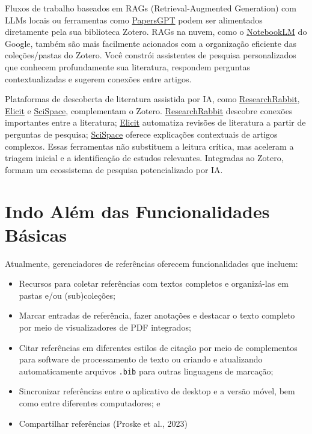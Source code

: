 \documentclass[
  a4paper,
]{book}
\begin{document}
Fluxos de trabalho baseados em RAGs (Retrieval-Augmented Generation) com
LLMs locais ou ferramentas como
\href{https://www.papersgpt.com/}{PapersGPT} podem ser alimentados
diretamente pela sua biblioteca Zotero. RAGs na nuvem, como o
\href{https://notebooklm.google.com/}{NotebookLM} do Google, também são
mais facilmente acionados com a organização eficiente das
coleções/pastas do Zotero. Você constrói assistentes de pesquisa
personalizados que conhecem profundamente sua literatura, respondem
perguntas contextualizadas e sugerem conexões entre artigos.

Plataformas de descoberta de literatura assistida por IA, como
\href{https://www.researchrabbit.ai/}{ResearchRabbit},
\href{https://elicit.com/}{Elicit} e
\href{https://scispace.com/}{SciSpace}, complementam o Zotero.
\href{https://www.researchrabbit.ai/}{ResearchRabbit} descobre conexões
importantes entre a literatura; \href{https://elicit.com/}{Elicit}
automatiza revisões de literatura a partir de perguntas de pesquisa;
\href{https://scispace.com/}{SciSpace} oferece explicações contextuais
de artigos complexos. Essas ferramentas não substituem a leitura
crítica, mas aceleram a triagem inicial e a identificação de estudos
relevantes. Integradas ao Zotero, formam um ecossistema de pesquisa
potencializado por IA.

\section{Indo Além das Funcionalidades
Básicas}\label{indo-aluxe9m-das-funcionalidades-buxe1sicas}

Atualmente, gerenciadores de referências oferecem funcionalidades que
incluem:

\begin{itemize}
\item
  Recursos para coletar referências com textos completos e organizá-las
  em pastas e/ou (sub)coleções;
\item
  Marcar entradas de referência, fazer anotações e destacar o texto
  completo por meio de visualizadores de PDF integrados;
\item
  Citar referências em diferentes estilos de citação por meio de
  complementos para software de processamento de texto ou criando e
  atualizando automaticamente arquivos \texttt{.bib} para outras
  linguagens de marcação;
\item
  Sincronizar referências entre o aplicativo de desktop e a versão
  móvel, bem como entre diferentes computadores; e
\item
  Compartilhar referências (Proske et al., 2023)
\end{itemize}
\end{document}
